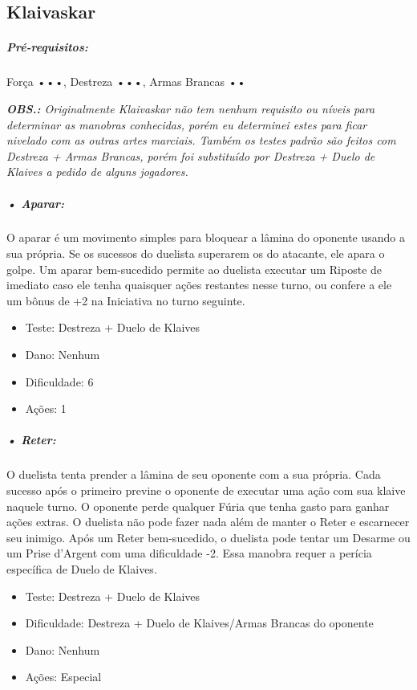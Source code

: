 
\subsection{\bf Klaivaskar}

\subparagraph*{\bf Pré-requisitos:} Força •••, Destreza •••, Armas Brancas ••

\textit{{\bf OBS.: } Originalmente Klaivaskar não tem nenhum requisito ou níveis para determinar as manobras conhecidas, porém eu determinei estes para ficar nivelado com as outras artes marciais. Também os testes padrão são feitos com Destreza + Armas Brancas, porém foi substituído por Destreza + Duelo de Klaives a pedido de alguns jogadores.}

\subparagraph{\bf • Aparar:}
O aparar é um movimento simples para bloquear a lâmina do oponente usando a sua própria. Se os sucessos do duelista superarem os do atacante, ele apara o golpe. Um aparar bem-sucedido permite ao duelista executar um Riposte de imediato caso ele tenha quaisquer ações restantes nesse turno, ou confere a ele um bônus de +2 na Iniciativa no turno seguinte.
\begin{itemize}[noitemsep]
\item Teste: Destreza + Duelo de Klaives
\item Dano: Nenhum
\item Dificuldade: 6 
\item Ações: 1
\end{itemize}

\subparagraph{\bf • Reter:}
O duelista tenta prender a lâmina de seu oponente com a sua própria. Cada sucesso após o primeiro previne o oponente de executar uma ação com sua klaive naquele turno. O oponente perde qualquer Fúria que tenha gasto para ganhar ações extras. O duelista não pode fazer nada além de manter o Reter e escarnecer seu inimigo. Após um Reter bem-sucedido, o duelista pode tentar um Desarme ou um Prise d'Argent com uma dificuldade -2. Essa manobra requer a perícia específica de Duelo de Klaives. 
\begin{itemize}[noitemsep]
\item Teste: Destreza + Duelo de Klaives
\item Dificuldade: Destreza + Duelo de Klaives/Armas Brancas do oponente
\item Dano: Nenhum
\item Ações: Especial
\end{itemize}

